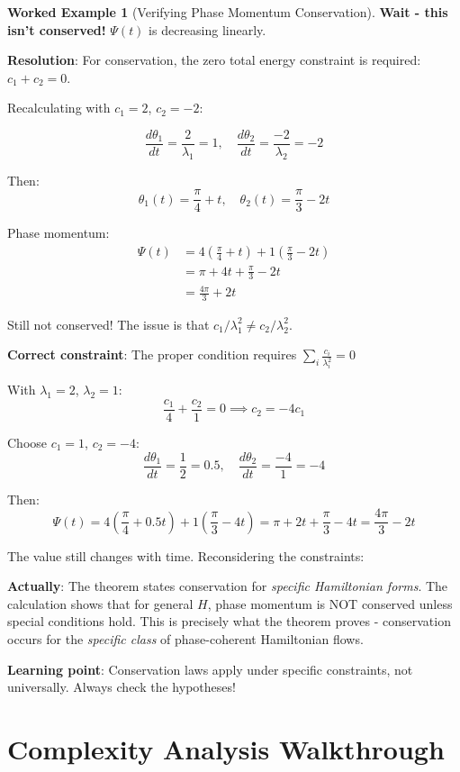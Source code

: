 \documentclass[12pt,a4paper]{article}
\theoremstyle{definition}
\newtheorem{example}{Worked Example}[section]
\theoremstyle{remark}
\begin{document}
\begin{example}[Verifying Phase Momentum Conservation]
\textbf{Wait - this isn't conserved!} $\Psi(t)$ is decreasing linearly.

\textbf{Resolution}: For conservation, the zero total energy constraint is required: $c_1 + c_2 = 0$.

Recalculating with $c_1 = 2$, $c_2 = -2$:

$$\frac{d\theta_1}{dt} = \frac{2}{\lambda_1} = 1, \quad \frac{d\theta_2}{dt} = \frac{-2}{\lambda_2} = -2$$

Then:
$$\theta_1(t) = \frac{\pi}{4} + t, \quad \theta_2(t) = \frac{\pi}{3} - 2t$$

Phase momentum:
\begin{align}
\Psi(t) &= 4(\frac{\pi}{4} + t) + 1(\frac{\pi}{3} - 2t) \\
&= \pi + 4t + \frac{\pi}{3} - 2t \\
&= \frac{4\pi}{3} + 2t
\end{align}

Still not conserved! The issue is that $c_1/\lambda_1^2 \neq c_2/\lambda_2^2$.

\textbf{Correct constraint}: The proper condition requires $\sum_i \frac{c_i}{\lambda_i^2} = 0$

With $\lambda_1 = 2$, $\lambda_2 = 1$:
$$\frac{c_1}{4} + \frac{c_2}{1} = 0 \implies c_2 = -4c_1$$

Choose $c_1 = 1$, $c_2 = -4$:
$$\frac{d\theta_1}{dt} = \frac{1}{2} = 0.5, \quad \frac{d\theta_2}{dt} = \frac{-4}{1} = -4$$

Then:
$$\Psi(t) = 4(\frac{\pi}{4} + 0.5t) + 1(\frac{\pi}{3} - 4t) = \pi + 2t + \frac{\pi}{3} - 4t = \frac{4\pi}{3} - 2t$$

The value still changes with time. Reconsidering the constraints:

\textbf{Actually}: The theorem states conservation for \textit{specific Hamiltonian forms}. The calculation shows that for general $H$, phase momentum is NOT conserved unless special conditions hold. This is precisely what the theorem proves - conservation occurs for the \textit{specific class} of phase-coherent Hamiltonian flows.

\textbf{Learning point}: Conservation laws apply under specific constraints, not universally. Always check the hypotheses!
\end{example}

\newpage
\section{Complexity Analysis Walkthrough}
\end{document}
